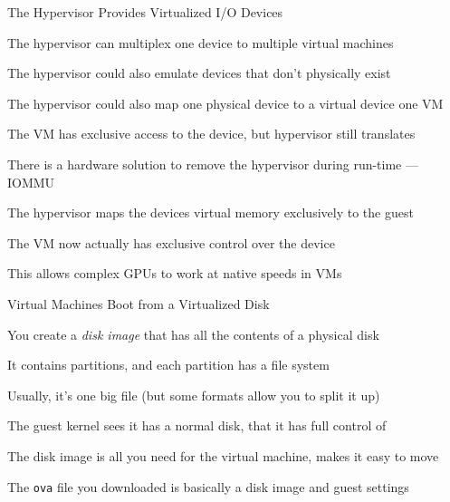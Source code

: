   \begin{frame}{The Hypervisor Provides Virtualized I/O Devices}

    The hypervisor can multiplex one device to multiple virtual machines

    \hspace{2em} The hypervisor could also emulate devices that don't
                 physically exist

    \vspace{2em}

    The hypervisor could also map one physical device to a virtual device
    one VM

    \hspace{2em} The VM has exclusive access to the device, but hypervisor
                 still translates

    \vspace{2em}

    There is a hardware solution to remove the hypervisor during run-time ---
    IOMMU

    \hspace{2em} The hypervisor maps the devices virtual memory exclusively
                 to the guest

    \hspace{4em} The VM now actually has exclusive control over the device

    \hspace{6em} This allows complex GPUs to work at native speeds in VMs
  \end{frame}

  \begin{frame}{Virtual Machines Boot from a Virtualized Disk}

    You create a \textit{disk image} that has all the contents of a physical
    disk

    \hspace{2em} It contains partitions, and each partition has a file system

    \vspace{2em}

    Usually, it's one big file (but some formats allow you to split it up)

    \hspace{2em} The guest kernel sees it has a normal disk, that it has full
                 control of

    \vspace{2em}

    The disk image is all you need for the virtual machine, makes it easy to
    move

    \hspace{2em} The \texttt{ova} file you downloaded is basically a disk image
                 and guest settings
  \end{frame}


